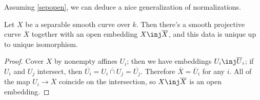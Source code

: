 Assuming \cref{sepopen}, we can deduce a nice generalization of normalizations.
\begin{cor}
Let $X$ be a separable smooth curve over $k$. Then there's a smooth projective curve $\overline X$ together with an
open embedding $X\inj\overline X$, and this data is unique up to unique isomorphism.
\end{cor}
\begin{proof}
Cover $X$ by nonempty affines $U_i$; then we have embeddings $U_i\inj\overline U_i$; if $U_i$ and $U_j$ intersect,
then $\overline{U_i} = \overline{U_i\cap U_j} = \overline{U_j}$. Therefore $\overline X = \overline U_i$ for any
$i$. All of the map $U_i\to\overline X$ coincide on the intersection, so $X\inj\overline X$ is an open embedding.
\end{proof}
